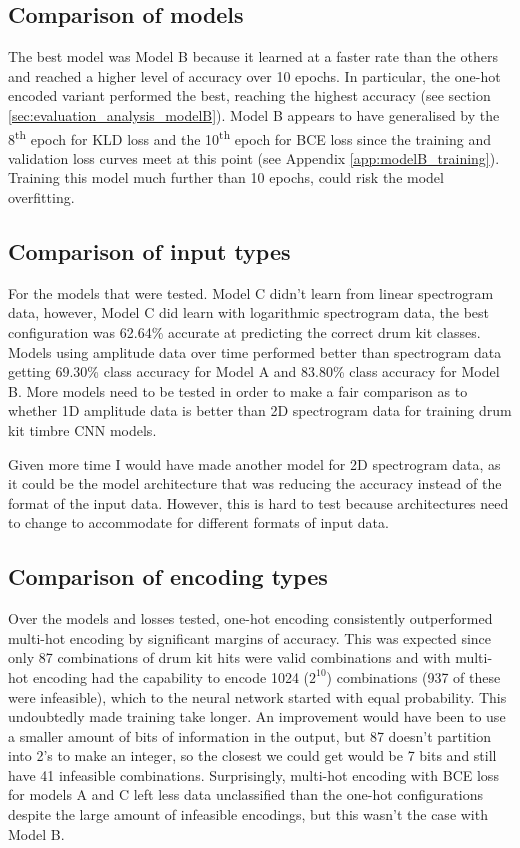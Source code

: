 \documentclass[12pt]{article}
\begin{document}
	\subsection{Comparison of models}
	The best model was Model B because it learned at a faster rate than the others and reached a higher level of accuracy over 10 epochs. In particular, the one-hot encoded variant performed the best, reaching the highest accuracy (see section \ref{sec:evaluation_analysis_modelB}). Model B appears to have generalised by the 8\textsuperscript{th} epoch for KLD loss and the 10\textsuperscript{th} epoch for BCE loss since the training and validation loss curves meet at this point (see Appendix \ref{app:modelB_training}). Training this model much further than 10 epochs, could risk the model overfitting.\medskip
	
	\subsection{Comparison of input types}
	
	For the models that were tested. Model C didn't learn from linear spectrogram data, however, Model C did learn with logarithmic spectrogram data, the best configuration was 62.64\% accurate at predicting the correct drum kit classes. Models using amplitude data over time performed better than spectrogram data getting 69.30\% class accuracy for Model A and 83.80\% class accuracy for Model B. More models need to be tested in order to make a fair comparison as to whether 1D amplitude data is better than 2D spectrogram data for training drum kit timbre CNN models.\medskip
	
	Given more time I would have made another model for 2D spectrogram data, as it could be the model architecture that was reducing the accuracy instead of the format of the input data. However, this is hard to test because architectures need to change to accommodate for different formats of input data.\medskip
	
	\subsection{Comparison of encoding types}
	
	Over the models and losses tested, one-hot encoding consistently outperformed multi-hot encoding by significant margins of accuracy. This was expected since only 87 combinations of drum kit hits were valid combinations and with multi-hot encoding had the capability to encode 1024 ($2^{10}$) combinations (937 of these were infeasible), which to the neural network started with equal probability. This undoubtedly made training take longer. An improvement would have been to use a smaller amount of bits of information in the output, but 87 doesn't partition into 2's to make an integer, so the closest we could get would be 7 bits and still have 41 infeasible combinations. Surprisingly, multi-hot encoding with BCE loss for models A and C left less data unclassified than the one-hot configurations despite the large amount of infeasible encodings, but this wasn't the case with Model B.\medskip
	
\end{document}
